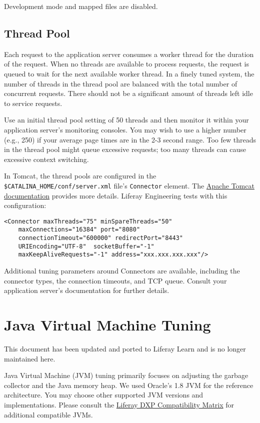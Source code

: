 Development mode and mapped files are disabled.

\section{Thread Pool}\label{thread-pool}

Each request to the application server consumes a worker thread for the
duration of the request. When no threads are available to process
requests, the request is queued to wait for the next available worker
thread. In a finely tuned system, the number of threads in the thread
pool are balanced with the total number of concurrent requests. There
should not be a significant amount of threads left idle to service
requests.

Use an initial thread pool setting of 50 threads and then monitor it
within your application server's monitoring consoles. You may wish to
use a higher number (e.g., 250) if your average page times are in the
2-3 second range. Too few threads in the thread pool might queue
excessive requests; too many threads can cause excessive context
switching.

In Tomcat, the thread pools are configured in the
\texttt{\$CATALINA\_HOME/conf/server.xml} file's \texttt{Connector}
element. The
\href{https://tomcat.apache.org/tomcat-9.0-doc/config/http.html}{Apache
Tomcat documentation} provides more details. Liferay Engineering tests
with this configuration:

\begin{verbatim}
<Connector maxThreads="75" minSpareThreads="50"
    maxConnections="16384" port="8080"     
    connectionTimeout="600000" redirectPort="8443"
    URIEncoding="UTF-8"  socketBuffer="-1"     
    maxKeepAliveRequests="-1" address="xxx.xxx.xxx.xxx"/>
\end{verbatim}

Additional tuning parameters around Connectors are available, including
the connector types, the connection timeouts, and TCP queue. Consult
your application server's documentation for further details.

\chapter{Java Virtual Machine Tuning}\label{java-virtual-machine-tuning}

{This document has been updated and ported to Liferay Learn and is no
longer maintained here.}

Java Virtual Machine (JVM) tuning primarily focuses on adjusting the
garbage collector and the Java memory heap. We used Oracle's 1.8 JVM for
the reference architecture. You may choose other supported JVM versions
and implementations. Please consult the
\href{https://web.liferay.com/group/customer/dxp/support/compatibility-matrix}{Liferay
DXP Compatibility Matrix} for additional compatible JVMs.

